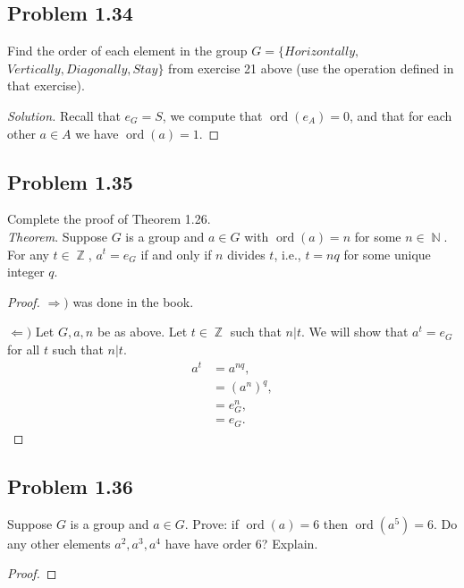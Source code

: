 \documentclass{amsbook}
\DeclareMathOperator{\ord}{\text{ord}}
\DeclareMathOperator{\N}{\mathbb{N}}
\DeclareMathOperator{\Z}{\mathbb{Z}}
\begin{document}
			\subsection*{Problem 1.34}
			\label{sub:problem_1_34}
			Find the order of each element in the group $G = \{Horizontally, $ \\
			$Vertically, Diagonally, Stay\}$ from exercise 21 above (use the operation defined in that exercise).
			\begin{proof}[Solution] Recall that $e_{G} = S$, we compute that $\ord(e_{A}) = 0$, and that for each other $a \in A$ we have $\ord(a) = 1$.
			\end{proof}

			\subsection*{Problem 1.35}
			\label{sub:problem_1_35}
			Complete the proof of Theorem 1.26.\\

			\noindent\textit{Theorem}. Suppose $G$ is a group and $a \in G$ with $\ord(a) = n$ for some $n \in \N$.
			For any $t \in \Z$, $a^{t} = e_{G}$ if and only if $n$ divides $t$, i.e., $t = nq$ for some unique integer $q$.
			\begin{proof} $\Rightarrow)$ was done in the book.

			$\Leftarrow)$ Let $G,a,n$ be as above.
			Let $t \in \Z$ such that $n|t$.
			We will show that $a^{t} = e_{G}$ for all $t$ such that $n|t$.
				\begin{align*}
					a^{t} &= a^{nq}, \\
					&= \left( a^{n} \right)^{q}, \\
					&= e_{G}^{n}, \\
					&= e_{G}.
				\end{align*}
			\end{proof}

			\subsection*{Problem 1.36}
			\label{sub:problem_1_36}
			Suppose $G$ is a group and $a \in G$. 
			Prove: if $\ord(a) = 6$ then $\ord(a^{5}) = 6$. 
			Do any other elements $a^{2}, a^{3}, a^{4}$ have have order 6? 
			Explain.
			\begin{proof}
			\end{proof}
\end{document}
